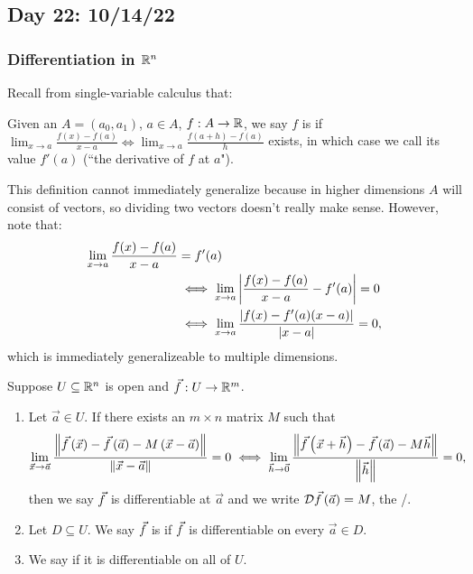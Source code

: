 \documentclass[main.tex]{subfiles}
\begin{document}
\subsection{Day 22: 10/14/22}

\subsubsection{Differentiation in $\RR^n$}
Recall from single-variable calculus that:
\begin{definition}[Differentiation in $\RR$]
    Given an $A = (a_0, a_1)$, $a\in A$, $f : A\to \mathbb R$, we say $f$ is  if $\lim_{x\to a} \frac{f(x) - f(a)}{x - a} \iff \lim_{x\to a} \frac{f(a + h) - f(a)}{h}$ exists, in which case we call its value $f'(a)$ (``the derivative of $f$ at $a$").   
\end{definition}

This definition cannot immediately generalize because in higher dimensions $A$ will consist of vectors, so dividing two vectors doesn't really make sense. However, note that:
\begin{align*}
    \lim_{x\to a} \frac{f(x) - f(a)}{x - a} &= f'(a) \\
    &\iff \lim_{x\to a} \left\lvert \frac{f(x) - f(a)}{x - a} - f'(a) \right\rvert = 0 \\
    &\iff \lim_{x\to a} \frac{\left\lvert f(x) - f'(a)(x - a) \right\rvert}{\left\lvert x - a \right\rvert} = 0,
\end{align*}
which is immediately generalizeable to multiple dimensions.

\begin{definition}[Differentiation in $\RR^n$]
    Suppose $U\subseteq \mathbb R^n$ is open and $\vec{f} : U \to \mathbb R^m$.
    \begin{enumerate}
        \item Let $\vec{a}\in U$. If there exists an $m\times n$ matrix $M$ such that
        \[\lim_{\vec{x}\to \vec{a}} \frac{\left\lVert \vec{f}\left( \vec{x} \right) - \vec{f}\left( \vec{a} \right) - M\left( \vec{x} - \vec{a} \right) \right\rVert}{\left\lVert \vec{x} - \vec{a} \right\rVert} = 0 \iff \lim_{\vec{h}\to \vec{0}} \frac{\left\lVert \vec{f}\left( \vec{x} + \vec{h} \right) - \vec{f}\left( \vec{a} \right) - M\vec{h} \right\rVert}{\left\lVert \vec{h} \right\rVert} = 0,\]
        then we say $\vec{f}$ is differentiable at $\vec{a}$ and we write $\mathcal{D}\vec{f}\left( \vec{a} \right) = M$, the /.
        \item Let $D\subseteq U$. We say $\vec{f}$ is  if $\vec{f}$ is differentiable on every $\vec{a}\in D$.
        \item We say  if it is differentiable on all of $U$.
    \end{enumerate}
\end{definition}
\end{document}

